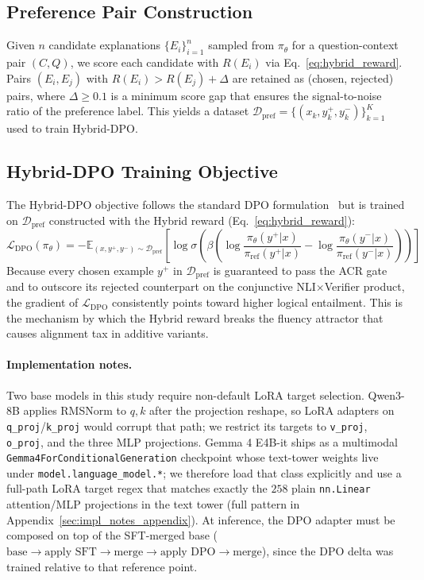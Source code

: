 \subsection{Preference Pair Construction}
\label{sec:pref_construction}

Given $n$ candidate explanations $\{E_i\}_{i=1}^n$ sampled from $\pi_\theta$ for a question-context pair $(C, Q)$, we score each candidate with $R(E_i)$ via Eq.~\ref{eq:hybrid_reward}. Pairs $(E_i, E_j)$ with $R(E_i) > R(E_j) + \Delta$ are retained as (chosen, rejected) pairs, where $\Delta \geq 0.1$ is a minimum score gap that ensures the signal-to-noise ratio of the preference label. This yields a dataset $\mathcal{D}_\text{pref} = \{(x_k, y_k^+, y_k^-)\}_{k=1}^K$ used to train Hybrid-DPO.

\subsection{Hybrid-DPO Training Objective}
\label{sec:hybrid_dpo}

The Hybrid-DPO objective follows the standard DPO formulation~\cite{rafailov2023direct} but is trained on $\mathcal{D}_\text{pref}$ constructed with the Hybrid reward (Eq.~\ref{eq:hybrid_reward}):
\begin{equation}
\mathcal{L}_\text{DPO}(\pi_\theta) = -\mathbb{E}_{(x,y^+,y^-)\sim\mathcal{D}_\text{pref}}\!\left[\log\sigma\!\left(\beta\!\left(\log\frac{\pi_\theta(y^+|x)}{\pi_\text{ref}(y^+|x)} - \log\frac{\pi_\theta(y^-|x)}{\pi_\text{ref}(y^-|x)}\right)\right)\right]
\label{eq:dpo_loss}
\end{equation}
Because every chosen example $y^+$ in $\mathcal{D}_\text{pref}$ is guaranteed to pass the ACR gate and to outscore its rejected counterpart on the conjunctive NLI$\times$Verifier product, the gradient of $\mathcal{L}_\text{DPO}$ consistently points toward higher logical entailment. This is the mechanism by which the Hybrid reward breaks the fluency attractor that causes alignment tax in additive variants.

\paragraph{Implementation notes.}
Two base models in this study require non-default LoRA target selection. Qwen3-8B applies RMSNorm to $q,k$ after the projection reshape, so LoRA adapters on \texttt{q\_proj}/\texttt{k\_proj} would corrupt that path; we restrict its targets to \texttt{v\_proj}, \texttt{o\_proj}, and the three MLP projections. Gemma 4 E4B-it ships as a multimodal \texttt{Gemma4ForConditionalGeneration} checkpoint whose text-tower weights live under \texttt{model.language\_model.*}; we therefore load that class explicitly and use a full-path LoRA target regex that matches exactly the $258$ plain \texttt{nn.Linear} attention/MLP projections in the text tower (full pattern in Appendix~\ref{sec:impl_notes_appendix}). At inference, the DPO adapter must be composed on top of the SFT-merged base ($\text{base}\to\text{apply SFT}\to\text{merge}\to\text{apply DPO}\to\text{merge}$), since the DPO delta was trained relative to that reference point.
